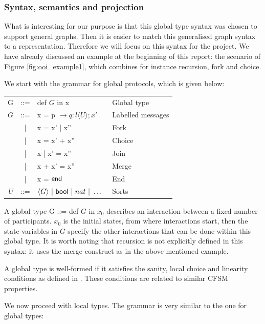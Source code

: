 \documentclass[a4paper,11pt,twoside]{report}
\newcommand{\kf}[1]{\textup{\textsf{#1}}\xspace}
\newcommand{\G}{\ensuremath{G}}
\newcommand{\UT}{\ensuremath{U}}
\newcommand{\End}{\kf{end}}
\newcommand{\Bool}{\kf{bool}}
\begin{document}
\subsubsection{Syntax, semantics and projection}
What is interesting for our purpose is that this global type syntax was chosen to support general graphs. Then it is easier to match this generalised graph syntax to a representation. Therefore we will focus on this syntax for the project. We have already discussed an example at the beginning of this report: the scenario of Figure \ref{fig:ooi_example1}, which combines for instance recursion, fork and choice.

We start with the grammar for global protocols, which is given below:

\begin{center}
\begin{tabular}{rcll}
G & ::= & def $\G$ in x & Global type \\
$\G$ & ::= & x  = p $\rightarrow q : l \langle \UT \rangle;x' $ & Labelled messages\\
& | & x = x' | x'' & Fork\\
& | & x = x' + x'' & Choice\\
& | & x | x' = x'' & Join\\
& | & x + x' = x'' & Merge\\
& | & x = $\End$ & End\\
\UT & ::= &$ \langle G\rangle\ |\ \Bool\ |\ nat \ |\ \ldots\ $ & Sorts
\end{tabular}
\end{center}

A global type G ::= def $\G$ in $x_0$ describes an interaction between a fixed number of participants. $x_0$ is the initial states, from where interactions start, then the state variables in $\G$ specify the other interactions that can be done within this global type. It is worth noting that recursion is not explicitly defined in this syntax: it uses the merge construct as in the above mentioned example.

A global type is well-formed if it satisfies the sanity, local choice and linearity conditions as defined in \cite{denielou2012multiparty}. These conditions are related to similar CFSM properties.

We now proceed with local types. The grammar is very similar to the one for global types:
\end{document}
